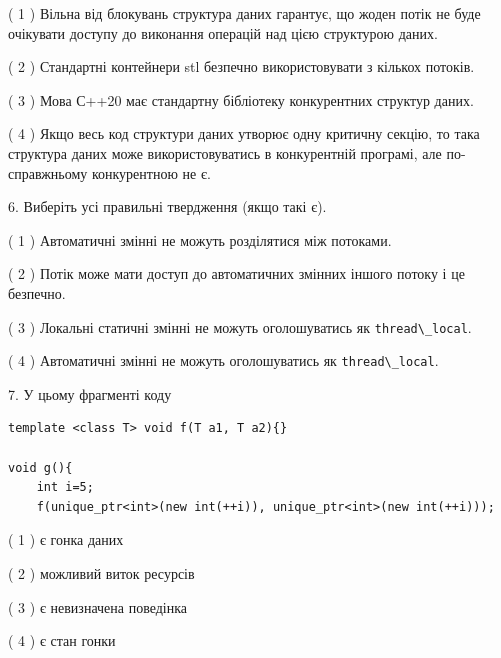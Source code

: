 \documentclass[12pt, ukrainian]{article}
\def\code#1{\Verb!#1!}
\begin{document}
\begin {large}
{( 1 ) Вільна від блокувань структура даних гарантує, що жоден потік не буде очікувати доступу до виконання операцій над цією структурою даних.%

( 2 ) Стандартні контейнери stl безпечно використовувати з кількох потоків.%

( 3 ) Мова С++20 має стандартну бібліотеку конкурентних структур даних.%

( 4 ) Якщо весь код структури даних утворює одну критичну секцію, то така структура даних може використовуватись в конкурентній програмі, але по-справжньо\-му конкурентною не є.%
\newpage



\vspace{5mm}
6. Виберіть усі правильні твердження (якщо такі є).\par
\vspace{2mm}

( 1 ) Автоматичні змінні не можуть розділятися між потоками.%

( 2 ) Потік може мати доступ до автоматичних змінних іншого потоку і це безпечно.%

( 3 ) Локальні статичні змінні не можуть оголошуватись як \code{thread\_local}.%

( 4 ) Автоматичні змінні не можуть оголошуватись як \code{thread\_local}.%


\vspace{5mm}
7. У цьому фрагменті коду
\begin{verbatim}
template <class T> void f(T a1, T a2){}

void g(){
    int i=5;
    f(unique_ptr<int>(new int(++i)), unique_ptr<int>(new int(++i)));
\end{verbatim}

( 1 ) є гонка даних%

( 2 ) можливий виток ресурсів%

( 3 ) є невизначена поведінка%

( 4 ) є стан гонки%
}
\end {large}
\end{document}
